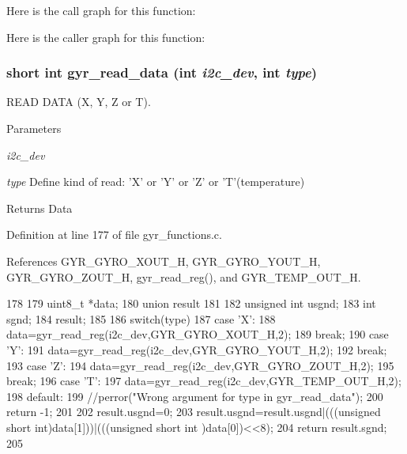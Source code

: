 Here is the call graph for this function:



Here is the caller graph for this function:

\hypertarget{group__gyr_ga271b37e9ace81b18bb2f83787247d262}{
\subsubsection[{gyr\_\-read\_\-data}]{\setlength{\rightskip}{0pt plus 5cm}short int gyr\_\-read\_\-data (int {\em i2c\_\-dev}, \/  int {\em type})}}
\label{group__gyr_ga271b37e9ace81b18bb2f83787247d262}


READ DATA (X, Y, Z or T). 


\begin{DoxyParams}{Parameters}
\item[{\em i2c\_\-dev}]\item[{\em type}]Define kind of read: 'X' or 'Y' or 'Z' or 'T'(temperature) \end{DoxyParams}
\begin{DoxyReturn}{Returns}
Data 
\end{DoxyReturn}


Definition at line 177 of file gyr\_\-functions.c.



References GYR\_\-GYRO\_\-XOUT\_\-H, GYR\_\-GYRO\_\-YOUT\_\-H, GYR\_\-GYRO\_\-ZOUT\_\-H, gyr\_\-read\_\-reg(), and GYR\_\-TEMP\_\-OUT\_\-H.




\begin{DoxyCode}
178 {
179   uint8_t *data;
180   union result
181   {
182     unsigned int usgnd;
183     int sgnd;
184   }result;
185 
186   switch(type){
187     case 'X':
188       data=gyr_read_reg(i2c_dev,GYR_GYRO_XOUT_H,2);
189       break;
190     case 'Y':
191       data=gyr_read_reg(i2c_dev,GYR_GYRO_YOUT_H,2);
192       break;
193     case 'Z':
194       data=gyr_read_reg(i2c_dev,GYR_GYRO_ZOUT_H,2);
195       break;
196     case 'T':
197       data=gyr_read_reg(i2c_dev,GYR_TEMP_OUT_H,2);
198     default:
199       //perror("Wrong argument for type in gyr_read_data");
200       return -1;
201   }
202   result.usgnd=0;
203   result.usgnd=result.usgnd|(((unsigned short int)data[1]))|(((unsigned short int
      )data[0])<<8);
204   return result.sgnd;
205 }
\end{DoxyCode}




